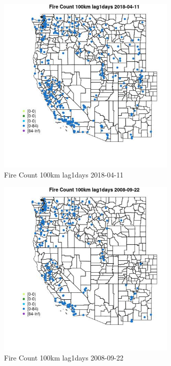 \begin{figure} 
\centering  
\includegraphics[width=0.77\textwidth]{Code_Outputs/Report_ML_input_PM25_Step4_part_e_de_duplicated_aves_compiled_2019-05-18wNAs_MapObsFire_Count_100km_lag1days2018-04-11.jpg} 
\caption{\label{fig:Report_ML_input_PM25_Step4_part_e_de_duplicated_aves_compiled_2019-05-18wNAsMapObsFire_Count_100km_lag1days2018-04-11}Fire Count 100km lag1days 2018-04-11} 
\end{figure} 
 

\begin{figure} 
\centering  
\includegraphics[width=0.77\textwidth]{Code_Outputs/Report_ML_input_PM25_Step4_part_e_de_duplicated_aves_compiled_2019-05-18wNAs_MapObsFire_Count_100km_lag1days2008-09-22.jpg} 
\caption{\label{fig:Report_ML_input_PM25_Step4_part_e_de_duplicated_aves_compiled_2019-05-18wNAsMapObsFire_Count_100km_lag1days2008-09-22}Fire Count 100km lag1days 2008-09-22} 
\end{figure} 
 

